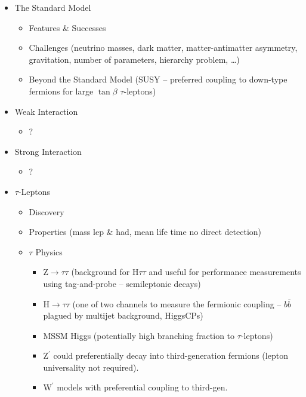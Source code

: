 \begin{itemize}
\item The Standard Model
  \begin{itemize}
  \item Features \& Successes
  \item Challenges (neutrino masses, dark matter, matter-antimatter asymmetry,
    gravitation, number of parameters, hierarchy problem, \ldots)
  \item Beyond the Standard Model (SUSY -- preferred coupling to down-type
    fermions for large $\tan\beta$ \textrightarrow $\tau$-leptons)
  \end{itemize}

\item Weak Interaction
\begin{itemize}
\item ?
\end{itemize}

\item Strong Interaction
\begin{itemize}
\item ?
\end{itemize}

\item $\tau$-Leptons
\begin{itemize}
\item Discovery
\item Properties (mass \textrightarrow lep \& had, mean life time
  \textrightarrow no direct detection)
\item $\tau$ Physics
  \begin{itemize}
  \item $\mathrm{Z} \rightarrow \tau \tau$ (background for H$\tau \tau$ and
    useful for performance measurements using tag-and-probe -- semileptonic
    decays)
  \item $\mathrm{H} \rightarrow \tau \tau$ (one of two channels to measure
    the fermionic coupling -- $b \bar{b}$ plagued by multijet background,
    HiggsCPs)
  \item MSSM Higgs (potentially high branching fraction to $\tau$-leptons)
  \item $\mathrm{Z}^\prime$ could preferentially decay into third-generation
    fermions (lepton universality not required).
  \item $\mathrm{W}^\prime$ models with preferential coupling to third-gen.
  \end{itemize}

\end{itemize}


\end{itemize}

